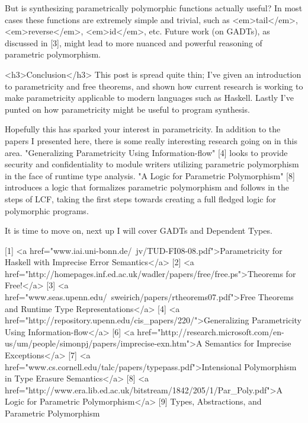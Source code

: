 But is synthesizing parametrically polymorphic functions actually useful? In most cases these functions are extremely simple and trivial, such as <em>tail</em>, <em>reverse</em>, <em>id</em>, etc. Future work (on GADTs), as discussed in [3], might lead to more nuanced and powerful reasoning of parametric polymorphism.

<h3>Conclusion</h3>
This post is spread quite thin; I've given an introduction to parametricity and free theorems, and shown how current research is working to make parametricity applicable to modern languages such as Haskell. Lastly I've punted on how parametricity might be useful to program synthesis.

Hopefully this has sparked your interest in parametricity. In addition to the papers I presented here, there is some really interesting research going on in this area. "Generalizing Parametricity Using Information-flow" [4] looks to provide security and confidentiality to module writers utilizing parametric polymorphism in the face of runtime type analysis. "A Logic for Parametric Polymorphism" [8] introduces a logic that formalizes parametric polymorphism and follows in the steps of LCF, taking the first steps towards creating a full fledged logic for polymorphic programs.

It is time to move on, next up I will cover GADTs and Dependent Types.

[1] <a href="www.iai.uni-bonn.de/~jv/TUD-FI08-08.pdf">Parametricity for Haskell with Imprecise Error Semantics</a>
[2] <a href="http://homepages.inf.ed.ac.uk/wadler/papers/free/free.ps">Theorems for Free!</a>
[3] <a href="www.seas.upenn.edu/~sweirich/papers/rtheorems07.pdf">Free Theorems and Runtime Type Representations</a>
[4] <a href="http://repository.upenn.edu/cis_papers/220/">Generalizing Parametricity Using Information-flow</a>
[6] <a href="http://research.microsoft.com/en-us/um/people/simonpj/papers/imprecise-exn.htm">A Semantics for Imprecise Exceptions</a>
[7] <a href="www.cs.cornell.edu/talc/papers/typepass.pdf">Intensional Polymorphism in Type Erasure Semantics</a> 
[8] <a href="http://www.era.lib.ed.ac.uk/bitstream/1842/205/1/Par_Poly.pdf">A Logic for Parametric Polymorphism</a>
[9] Types, Abstractions, and Parametric Polymorphism
